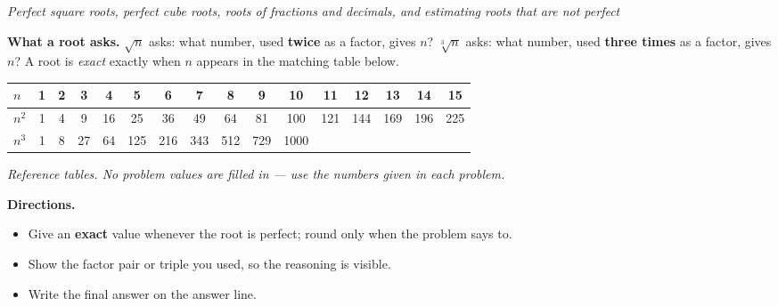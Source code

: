 \documentclass[12pt]{article}
\begin{document}

\begin{center}
\textit{Perfect square roots, perfect cube roots, roots of fractions and
decimals, and estimating roots that are not perfect}
\end{center}

\noindent\textbf{What a root asks.} $\sqrt{n}$ asks: what number, used
\textbf{twice} as a factor, gives $n$? \; $\sqrt[3]{n}$ asks: what number, used
\textbf{three times} as a factor, gives $n$? A root is \emph{exact} exactly when
$n$ appears in the matching table below.

\begin{center}\small
\begin{tabular}{|l|c|c|c|c|c|c|c|c|c|c|c|c|c|c|c|}
\hline
$n$ & 1 & 2 & 3 & 4 & 5 & 6 & 7 & 8 & 9 & 10 & 11 & 12 & 13 & 14 & 15 \\ \hline
$n^2$ & 1 & 4 & 9 & 16 & 25 & 36 & 49 & 64 & 81 & 100 & 121 & 144 & 169 & 196 & 225 \\ \hline
$n^3$ & 1 & 8 & 27 & 64 & 125 & 216 & 343 & 512 & 729 & 1000 & \multicolumn{5}{c|}{} \\ \hline
\end{tabular}

\small\textit{Reference tables. No problem values are filled in --- use the
numbers given in each problem.}\normalsize
\end{center}

\noindent\textbf{Directions.}
\begin{itemize}[leftmargin=1.2cm, itemsep=2pt, topsep=2pt]
\item Give an \textbf{exact} value whenever the root is perfect; round only when
the problem says to.
\item Show the factor pair or triple you used, so the reasoning is visible.
\item Write the final answer on the answer line.
\end{itemize}


\end{document}
